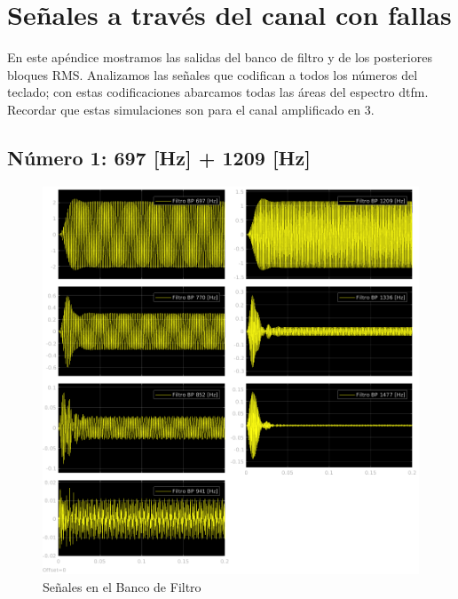 \chapter{Señales a través del canal con fallas}
En este apéndice mostramos las salidas del banco de filtro y de los posteriores bloques RMS. Analizamos las señales que codifican a todos los números del teclado; con estas codificaciones abarcamos todas las áreas del espectro \gls{dtfm}. Recordar que estas simulaciones son para el canal amplificado en 3.

\pagebreak

\section{Número 1: 697 [Hz] + 1209 [Hz]}
\label{sec:signal_1}
\begin{figure}[H]
  \centering
  \includegraphics[width=\linewidth]{images/simulacion/fallas/bank/1.png}
  \caption{Señales en el Banco de Filtro}
  \label{fig:num_1_bank}
\end{figure}

